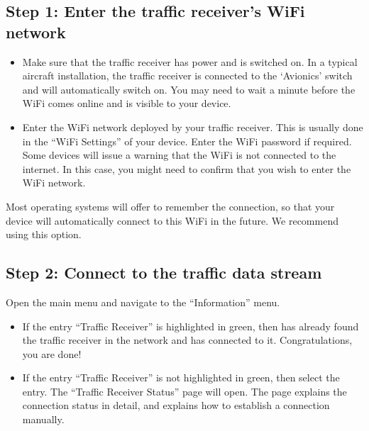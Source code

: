 \documentclass[letterpaper,10pt,english]{sphinxmanual}
\begin{document}
\subsection{Step 1: Enter the traffic receiver’s Wi\sphinxhyphen{}Fi network}
\label{\detokenize{02-steps/traffic:step-1-enter-the-traffic-receiver-s-wi-fi-network}}\begin{itemize}
\item {} 
\sphinxAtStartPar
Make sure that the traffic receiver has power and is switched on. In a typical
aircraft installation, the traffic receiver is connected to the ‘Avionics’
switch and will automatically switch on. You may need to wait a minute before
the Wi\sphinxhyphen{}Fi comes online and is visible to your device.

\item {} 
\sphinxAtStartPar
Enter the Wi\sphinxhyphen{}Fi network deployed by your traffic receiver. This is usually
done in the “Wi\sphinxhyphen{}Fi Settings” of your device. Enter the Wi\sphinxhyphen{}Fi password if
required. Some devices will issue a warning that the Wi\sphinxhyphen{}Fi is not connected to
the internet. In this case, you might need to confirm that you wish to enter
the Wi\sphinxhyphen{}Fi network.

\end{itemize}

\sphinxAtStartPar
Most operating systems will offer to remember the connection, so that your
device will automatically connect to this Wi\sphinxhyphen{}Fi in the future. We recommend
using this option.


\subsection{Step 2: Connect to the traffic data stream}
\label{\detokenize{02-steps/traffic:step-2-connect-to-the-traffic-data-stream}}
\sphinxAtStartPar
Open the main menu and navigate to the “Information” menu.
\begin{itemize}
\item {} 
\sphinxAtStartPar
If the entry “Traffic Receiver” is highlighted in green, then  has already found the traffic receiver in the network and has
connected to it. Congratulations, you are done!

\item {} 
\sphinxAtStartPar
If the entry “Traffic Receiver” is not highlighted in green, then select the
entry. The “Traffic Receiver Status” page will open. The page explains the
connection status in detail, and explains how to establish a connection
manually.

\end{itemize}
\end{document}
